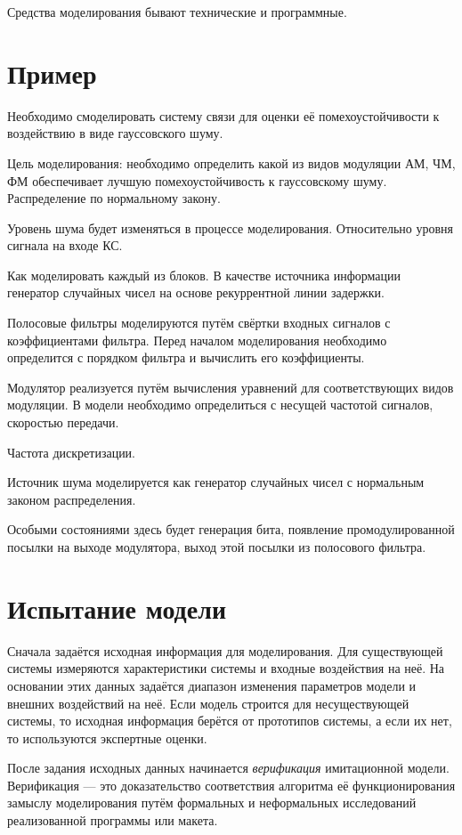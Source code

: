 \documentclass[12pt, russian, oneside, article]{ncc}
\begin{document}
Средства моделирования бывают технические и программные.
\section{Пример}
\label{sec-5}


Необходимо смоделировать систему связи для оценки её помехоустойчивости к воздействию в виде гауссовского шуму.

Цель моделирования: необходимо определить какой из видов модуляции АМ, ЧМ, ФМ обеспечивает лучшую помехоустойчивость к гауссовскому шуму. Распределение по нормальному закону.

Уровень шума будет изменяться в процессе моделирования. Относительно уровня сигнала на входе КС.

Как моделировать каждый из блоков. В качестве источника информации генератор случайных чисел на основе рекуррентной линии задержки.

Полосовые фильтры моделируются путём свёртки входных сигналов с коэффициентами фильтра. Перед началом моделирования необходимо определится с порядком фильтра и вычислить его коэффициенты.

Модулятор реализуется путём вычисления уравнений для соответствующих видов модуляции. В модели необходимо определиться с несущей частотой сигналов, скоростью передачи.

Частота дискретизации.

Источник шума моделируется как генератор случайных чисел с нормальным законом распределения.

Особыми состояниями здесь будет генерация бита, появление промодулированной посылки на выходе модулятора, выход этой посылки из полосового фильтра.
\section{Испытание модели}
\label{sec-6}


Сначала задаётся исходная информация для моделирования. Для существующей системы измеряются характеристики системы и входные воздействия на неё. На основании этих данных задаётся диапазон изменения параметров модели и внешних воздействий на неё. Если модель строится для несуществующей системы, то исходная информация берётся от прототипов системы, а если их нет, то используются экспертные оценки.

После задания исходных данных начинается \emph{верификация} имитационной модели. Верификация --- это доказательство соответствия алгоритма её функционирования замыслу моделирования путём формальных и неформальных исследований реализованной программы или макета.
\end{document}
